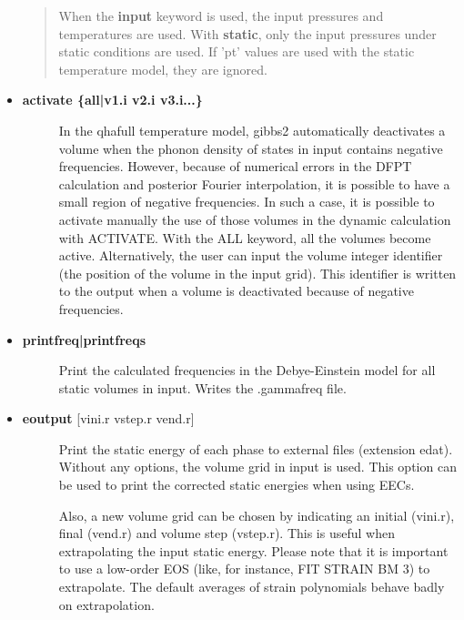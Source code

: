 \documentclass[a4paper]{article}
\begin{document}
\begin{itemize}
\begin{quote}
\begin{itemize}
\begin{description}
\end{description}

\end{itemize}

When the \textbf{input} keyword is used, the input pressures and
temperatures are used. With \textbf{static}, only the input pressures
under static conditions are used. If 'pt' values are used with
the static temperature model, they are ignored.

\end{quote}

\item %
\begin{description}
\item[{\textbf{activate \{all|v1.i v2.i v3.i...\}}}] \leavevmode 
In the qhafull temperature model, gibbs2 automatically deactivates
a volume when the phonon density of states in input contains
negative frequencies. However, because of numerical errors in the
DFPT calculation and posterior Fourier interpolation, it is
possible to have a small region of negative frequencies. In such a
case, it is possible to activate manually the use of those volumes
in the dynamic calculation with ACTIVATE. With the ALL keyword, all
the volumes become active. Alternatively, the user can input the
volume integer identifier (the position of the volume in the input
grid). This identifier is written to the output when a volume is
deactivated because of negative frequencies.

\end{description}

\item %
\begin{description}
\item[{\textbf{printfreq|printfreqs}}] \leavevmode 
Print the calculated frequencies in the Debye-Einstein model for
all static volumes in input. Writes the .gammafreq file.

\end{description}

\item %
\begin{description}
\item[{\textbf{eoutput} {[}vini.r vstep.r vend.r{]}}] \leavevmode 
Print the static energy of each phase to external files (extension
edat). Without any options, the volume grid in input is used. This
option can be used to print the corrected static energies when
using EECs.

Also, a new volume grid can be chosen by indicating an initial
(vini.r), final (vend.r) and volume step (vstep.r). This is useful
when extrapolating the input static energy. Please note that it is
important to use a low-order EOS (like, for instance, FIT STRAIN BM
3) to extrapolate. The default averages of strain polynomials
behave badly on extrapolation.


\end{description}
\end{itemize}
\end{document}
